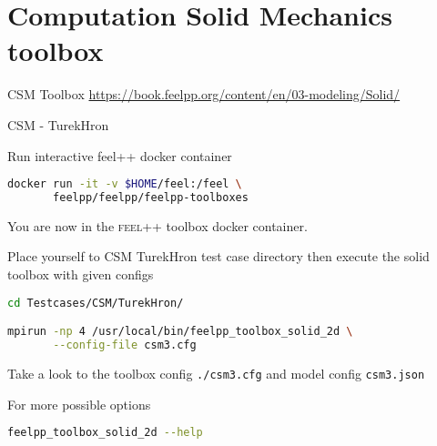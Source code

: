 








\section[CSM]{Computation Solid Mechanics toolbox}

\begin{frame}[standout]{CSM Toolbox}
  \url{https://book.feelpp.org/content/en/03-modeling/Solid/}
\end{frame}


\begin{frame}{CSM - TurekHron}

Run  interactive feel++ docker container

\begin{lstlisting}[language=Bash,mathescape=false,emph={docker}]
docker run -it -v $HOME/feel:/feel \
       feelpp/feelpp/feelpp-toolboxes
\end{lstlisting}

You are now in the \textsc{feel++} toolbox docker container.

Place yourself to CSM TurekHron test case directory then execute the
solid toolbox with given configs

\begin{lstlisting}[language=Bash,mathescape=false, emph={feelpp_toolbox_solid_2d}]
cd Testcases/CSM/TurekHron/

mpirun -np 4 /usr/local/bin/feelpp_toolbox_solid_2d \
       --config-file csm3.cfg
\end{lstlisting}

Take a look to the toolbox config \lstinline{./csm3.cfg} and model config
\lstinline{csm3.json}

For more possible options
\begin{lstlisting}[language=Bash,mathescape=false, emph={feelpp_toolbox_solid_2d}]
feelpp_toolbox_solid_2d --help
\end{lstlisting}

\end{frame}




